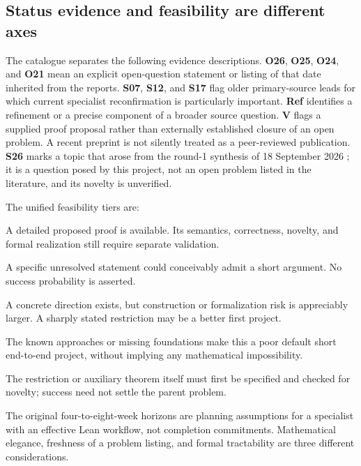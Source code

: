\documentclass[11pt,a4paper]{article}
\theoremstyle{definition}\newtheorem{definition}[theorem]{Definition}
\theoremstyle{remark}\newtheorem{remark}[theorem]{Remark}
\begin{document}
\subsection{Status evidence and feasibility are different axes}
The catalogue separates the following evidence descriptions. \textbf{O26}, \textbf{O25}, \textbf{O24}, and \textbf{O21} mean an explicit open-question statement or listing of that date inherited from the reports. \textbf{S07}, \textbf{S12}, and \textbf{S17} flag older primary-source leads for which current specialist reconfirmation is particularly important. \textbf{Ref} identifies a refinement or a precise component of a broader source question. \textbf{V} flags a supplied proof proposal rather than externally established closure of an open problem. A recent preprint is not silently treated as a peer-reviewed publication. \textbf{S26} marks a topic that arose from the round-1 synthesis of 18 September 2026 \cite{Synthesis}; it is a question posed by this project, not an open problem listed in the literature, and its novelty is unverified.

The unified feasibility tiers are:
\begin{description}[style=nextline]
\item[V: validation candidate.] A detailed proposed proof is available. Its semantics, correctness, novelty, and formal realization still require separate validation.
\item[B: bounded speculative target.] A specific unresolved statement could conceivably admit a short argument. No success probability is asserted.
\item[E: exploratory target.] A concrete direction exists, but construction or formalization risk is appreciably larger. A sharply stated restriction may be a better first project.
\item[H: high-dependency full target.] The known approaches or missing foundations make this a poor default short end-to-end project, without implying any mathematical impossibility.
\item[R: bounded research programme.] The restriction or auxiliary theorem itself must first be specified and checked for novelty; success need not settle the parent problem.
\end{description}
The original four-to-eight-week horizons are planning assumptions for a specialist with an effective Lean workflow, not completion commitments. Mathematical elegance, freshness of a problem listing, and formal tractability are three different considerations.
\end{document}
